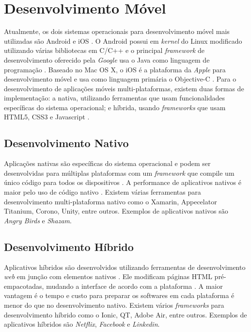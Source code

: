 \section{Desenvolvimento Móvel}

Atualmente, os dois sistemas operacionais para desenvolvimento móvel mais utilizadas são Android e iOS \cite{gartner-top-os}. O Android possui em \textit{kernel} do Linux modificado utilizando várias bibliotecas em C/C++ \cite{mobile-dev} e o principal \textit{framework} de desenvolvimento oferecido pela \textit{Google} usa o Java como linguagem de programação \cite{android}. Baseado no Mac OS X, o iOS é a plataforma da \textit{Apple} para desenvolvimento móvel e usa como linguagem primária o Objective-C \cite{mobile-dev}. Para o desenvolvimento de aplicações móveis multi-plataformas, existem duas formas de implementação: a nativa, utilizando ferramentas que usam funcionalidades específicas do sistema operacional; e híbrida, usando \textit{frameworks} que usam HTML5, CSS3 e Javascript \cite{mobile-dev-2}.

\subsection{Desenvolvimento Nativo}

Aplicações nativas são específicas do sistema operacional e podem ser desenvolvidas para múltiplas plataformas com um \textit{framework} que compile um único código para todos os dispositivos \cite{hybrid-1}. A performance de aplicativos nativos é maior pelo uso de código nativo \cite{hybrid-2}. Existem várias ferramentas para desenvolvimento multi-plataforma nativo como o Xamarin, Appecelator Titanium, Corono, Unity, entre outros. Exemplos de aplicativos nativos são \textit{Angry Birds} e \textit{Shazam}.

\subsection{Desenvolvimento Híbrido}

Aplicativos híbridos são desenvolvidos utilizando ferramentas de desenvolvimento \textit{web} em junção com elementos nativos \cite{hybrid-1}. Ele modificam páginas HTML pré-empacotadas, mudando a interface de acordo com a plataforma \cite{hybrid-2}. A maior vantagem é o tempo e custo para preparar os softwares em cada plataforma é menor do que no desenvolvimento nativo. Existem vários \textit{frameworks} para desenvolvimento híbrido como o Ionic, QT, Adobe Air, entre outros. Exemplos de aplicativos híbridos são \textit{Netflix}, \textit{Facebook} e \textit{Linkedin}.

